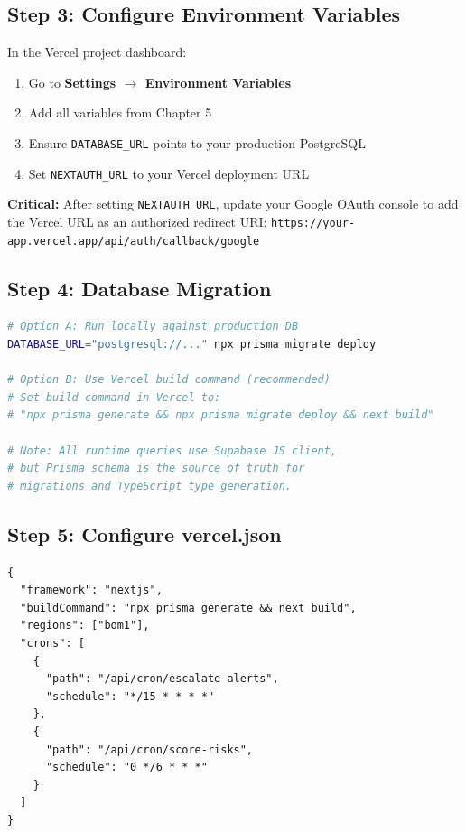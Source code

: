 \documentclass[12pt,a4paper]{report}
\begin{document}
\subsection{Step 3: Configure Environment Variables}

In the Vercel project dashboard:
\begin{enumerate}
  \item Go to \textbf{Settings $\rightarrow$ Environment Variables}
  \item Add all variables from Chapter 5
  \item Ensure \texttt{DATABASE\_URL} points to your production PostgreSQL
  \item Set \texttt{NEXTAUTH\_URL} to your Vercel deployment URL
\end{enumerate}

\begin{critbox}
\textbf{Critical:} After setting \texttt{NEXTAUTH\_URL}, update your Google OAuth console to add the Vercel URL as an authorized redirect URI: \texttt{https://your-app.vercel.app/api/auth/callback/google}
\end{critbox}

\subsection{Step 4: Database Migration}

\begin{lstlisting}[language=bash, caption={Run Prisma migrations against production}]
# Option A: Run locally against production DB
DATABASE_URL="postgresql://..." npx prisma migrate deploy

# Option B: Use Vercel build command (recommended)
# Set build command in Vercel to:
# "npx prisma generate && npx prisma migrate deploy && next build"

# Note: All runtime queries use Supabase JS client,
# but Prisma schema is the source of truth for
# migrations and TypeScript type generation.
\end{lstlisting}

\subsection{Step 5: Configure vercel.json}

\begin{lstlisting}[caption={vercel.json (project root)}]
{
  "framework": "nextjs",
  "buildCommand": "npx prisma generate && next build",
  "regions": ["bom1"],
  "crons": [
    {
      "path": "/api/cron/escalate-alerts",
      "schedule": "*/15 * * * *"
    },
    {
      "path": "/api/cron/score-risks",
      "schedule": "0 */6 * * *"
    }
  ]
}
\end{lstlisting}
\end{document}
